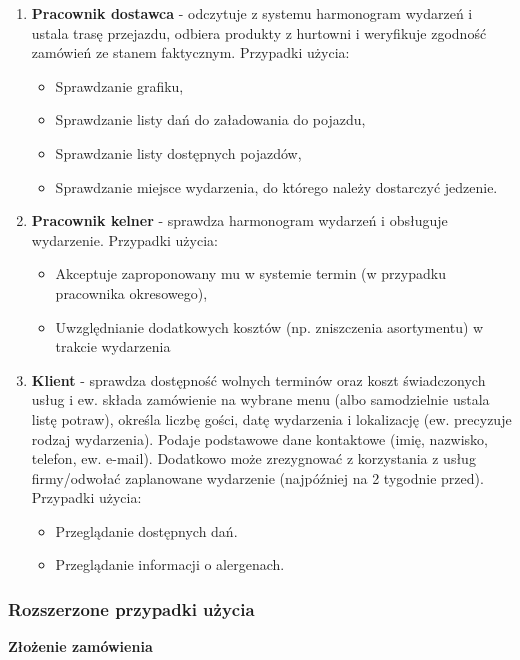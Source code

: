 \documentclass[10pt]{article}
\begin{document}
\begin{enumerate}
    \item \textbf{Pracownik dostawca} - odczytuje z systemu harmonogram wydarzeń i ustala trasę przejazdu, odbiera produkty z hurtowni i weryfikuje zgodność zamówień ze stanem faktycznym. Przypadki użycia:
    \begin{itemize}
        \item Sprawdzanie grafiku,
        \item Sprawdzanie listy dań do załadowania do pojazdu,
        \item Sprawdzanie listy dostępnych pojazdów,
        \item Sprawdzanie miejsce wydarzenia, do którego należy dostarczyć jedzenie.
    \end{itemize}
    
    \item \textbf{Pracownik kelner} - sprawdza harmonogram wydarzeń i obsługuje wydarzenie. Przypadki użycia:
    \begin{itemize}
        \item Akceptuje zaproponowany mu w systemie termin (w przypadku pracownika okresowego),
        \item Uwzględnianie dodatkowych kosztów (np. zniszczenia asortymentu) w trakcie wydarzenia
    \end{itemize}
    
    \item \textbf{Klient} - sprawdza dostępność wolnych terminów oraz koszt świadczonych usług i ew. składa zamówienie na wybrane menu (albo samodzielnie ustala listę potraw), określa liczbę gości, datę wydarzenia i lokalizację (ew. precyzuje rodzaj wydarzenia). Podaje podstawowe dane kontaktowe (imię, nazwisko, telefon, ew. e-mail). Dodatkowo może zrezygnować z korzystania z usług firmy/odwołać zaplanowane wydarzenie (najpóźniej na 2 tygodnie przed). Przypadki użycia:
    \begin{itemize}
        \item Przeglądanie dostępnych dań.
        \item Przeglądanie informacji o alergenach.
    \end{itemize}
\end{enumerate}

\subsubsection{Rozszerzone przypadki użycia}

\noindent\textbf{Złożenie zamówienia}
\end{document}
